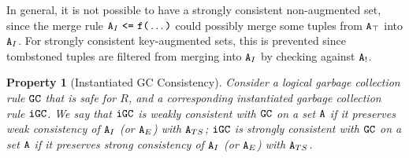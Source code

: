 \documentclass{article}
\numberwithin{equation}{section}
\newtheorem{property}{Property}[section]
\renewcommand{\tt}[1]{\ifmmode\text{\texttt{#1}}\else\texttt{#1}\fi}
\begin{document}
In general, it is not possible to have a strongly consistent non-augmented set, since the merge rule $\tt{A}_I ~\tt{<=}~ \tt{f}\tt{(}\dots\tt{)}$ could possibly merge some tuples from $\tt{A}_\top$ into $\tt{A}_I$.
For strongly consistent key-augmented sets, this is prevented since tombstoned tuples are filtered from merging into $\tt{A}_I$ by checking against $\tt{A}_!$.

\begin{property}[Instantiated GC Consistency]\label{property:instantiated_gc_consistent}
Consider a logical garbage collection rule $\tt{GC}$ that is safe for $R$, and a corresponding instantiated garbage collection rule $\tt{iGC}$.
We say that
$\tt{iGC}$ is \emph{weakly consistent} with $\tt{GC}$ on a set $\tt{A}$ if it preserves weak consistency of $\tt{A}_I$ (or $\tt{A}_E$) with $\tt{A}_{TS}$;
$\tt{iGC}$ is \emph{strongly consistent} with $\tt{GC}$ on a set $\tt{A}$ if it preserves strong consistency of $\tt{A}_I$ (or $\tt{A}_E$) with $\tt{A}_{TS}$.


\end{property}
\end{document}
